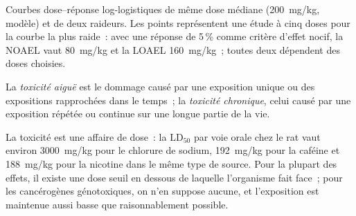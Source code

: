 \begin{omfigure}

{\small Courbes dose--réponse log-logistiques de même dose médiane
(\qty{200}{mg/kg}, modèle) et de deux raideurs. Les points représentent une
étude à cinq doses pour la courbe la plus raide~: avec une réponse de
5\,\% comme critère d'effet nocif, la NOAEL vaut \qty{80}{mg/kg} et la
LOAEL \qty{160}{mg/kg}~; toutes deux dépendent des doses choisies.}
\end{omfigure}

\begin{definition}\label{def:b3:environmental-toxicology:toxicity}
La \emph{toxicité aiguë} est le dommage causé par une exposition
unique ou des expositions rapprochées dans le temps~; la \emph{toxicité chronique},
celui causé par une exposition répétée ou continue sur une longue partie
de la vie.
\end{definition}

La toxicité est une affaire de dose~: la $\mathrm{LD_{50}}$ par voie orale chez le rat vaut environ \qty{3000}{mg/kg} pour le chlorure de sodium,
\qty{192}{mg/kg} pour la caféine et \qty{188}{mg/kg} pour la nicotine dans le même type de source. Pour la plupart des effets, il
existe une dose seuil en dessous de laquelle l'organisme fait face~; pour
les cancérogènes génotoxiques, on n'en suppose aucune, et l'exposition est
maintenue aussi basse que raisonnablement possible.

